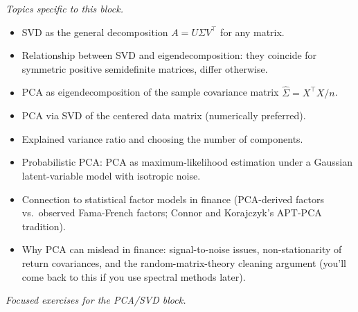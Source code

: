 \emph{Topics specific to this block.}

\begin{itemize}
\tightlist
\item
  SVD as the general decomposition \(A = U \Sigma V^\top\) for any
  matrix.
\item
  Relationship between SVD and eigendecomposition: they coincide for
  symmetric positive semidefinite matrices, differ otherwise.
\item
  PCA as eigendecomposition of the sample covariance matrix
  \(\hat{\Sigma} = X^\top X / n\).
\item
  PCA via SVD of the centered data matrix (numerically preferred).
\item
  Explained variance ratio and choosing the number of components.
\item
  Probabilistic PCA: PCA as maximum-likelihood estimation under a
  Gaussian latent-variable model with isotropic noise.
\item
  Connection to statistical factor models in finance (PCA-derived
  factors vs.~observed Fama-French factors; Connor and Korajczyk's
  APT-PCA tradition).
\item
  Why PCA can mislead in finance: signal-to-noise issues,
  non-stationarity of return covariances, and the random-matrix-theory
  cleaning argument (you'll come back to this if you use spectral
  methods later).
\end{itemize}

\emph{Focused exercises for the PCA/SVD block.}

